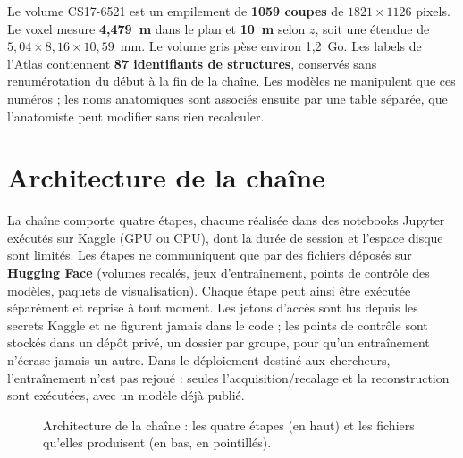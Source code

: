 \documentclass[12pt,a4paper]{report}
\begin{document}
Le volume CS17-6521 est un empilement de \textbf{1059 coupes} de $1821\times1126$ pixels. Le voxel mesure \textbf{4,479~\textmu m} dans le plan et \textbf{10~\textmu m} selon $z$, soit une étendue de $5{,}04 \times 8{,}16 \times 10{,}59$~mm. Le volume gris pèse environ 1,2~Go. Les labels de l'Atlas contiennent \textbf{87 identifiants de structures}, conservés sans renumérotation du début à la fin de la chaîne. Les modèles ne manipulent que ces numéros ; les noms anatomiques sont associés ensuite par une table séparée, que l'anatomiste peut modifier sans rien recalculer.

\section{Architecture de la chaîne}

La chaîne comporte quatre étapes, chacune réalisée dans des notebooks Jupyter exécutés sur Kaggle (GPU ou CPU), dont la durée de session et l'espace disque sont limités. Les étapes ne communiquent que par des fichiers déposés sur \textbf{Hugging Face} (volumes recalés, jeux d'entraînement, points de contrôle des modèles, paquets de visualisation). Chaque étape peut ainsi être exécutée séparément et reprise à tout moment. Les jetons d'accès sont lus depuis les secrets Kaggle et ne figurent jamais dans le code ; les points de contrôle sont stockés dans un dépôt privé, un dossier par groupe, pour qu'un entraînement n'écrase jamais un autre. Dans le déploiement destiné aux chercheurs, l'entraînement n'est pas rejoué : seules l'acquisition/recalage et la reconstruction sont exécutées, avec un modèle déjà publié.

\begin{figure}[H]
\centering
{}
\caption[Architecture de la chaîne]{Architecture de la chaîne : les quatre étapes (en haut) et les fichiers qu'elles produisent (en bas, en pointillés).}
\label{fig:pipeline}
\end{figure}
\end{document}
